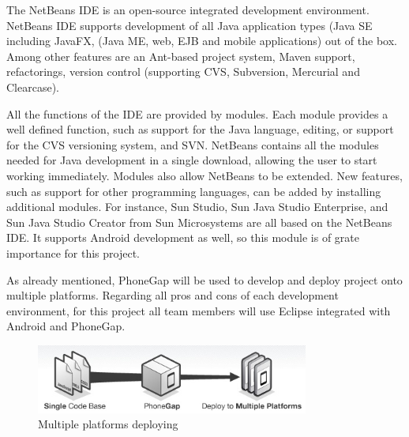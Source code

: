 The NetBeans IDE is an open-source integrated development environment. NetBeans IDE supports development of all Java application types (Java SE including JavaFX, (Java ME, web, EJB and mobile applications) out of the box. Among other features are an Ant-based project system, Maven support, refactorings, version control (supporting CVS, Subversion, Mercurial and Clearcase).

All the functions of the IDE are provided by modules. Each module provides a well defined function, such as support for the Java language, editing, or support for the CVS versioning system, and SVN. NetBeans contains all the modules needed for Java development in a single download, allowing the user to start working immediately. Modules also allow NetBeans to be extended. New features, such as support for other programming languages, can be added by installing additional modules. For instance, Sun Studio, Sun Java Studio Enterprise, and Sun Java Studio Creator from Sun Microsystems are all based on the NetBeans IDE. It supports Android development as well, so this module is of grate importance for this project.

As already mentioned, PhoneGap will be used to develop and deploy project onto multiple platforms. Regarding all pros and cons of each development environment, for this project all team members will use Eclipse integrated with Android and PhoneGap.\newline

\begin{figure}[phonegap]
	\centering
	\includegraphics[width=0.8\textwidth]{prestudy/development_environment/PhoneGap.jpg}
	\caption{Multiple platforms deploying}
	\label{fig:phonegap}
\end{figure}
